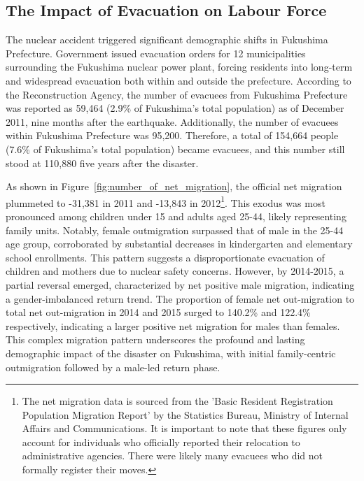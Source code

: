 \documentclass[a4paper,12pt]{article}
\begin{document}


\clearpage
\subsection{The Impact of Evacuation on Labour Force}
\label{sec4.1}

The nuclear accident triggered significant demographic shifts in Fukushima Prefecture. Government issued evacuation orders for 12 municipalities surrounding the Fukushima nuclear power plant, forcing residents into long-term and widespread evacuation both within and outside the prefecture. According to the Reconstruction Agency, the number of evacuees from Fukushima Prefecture was reported as 59,464 (2.9\% of Fukushima's total population) as of December 2011, nine months after the earthquake. Additionally, the number of evacuees within Fukushima Prefecture was 95,200. Therefore, a total of 154,664 people (7.6\% of Fukushima's total population) became evacuees, and this number still stood at 110,880 five years after the disaster.


As shown in Figure~\ref{fig:number_of_net_migration}, the official net migration plummeted to -31,381 in 2011 and -13,843 in 2012\footnote{The net migration data is sourced from the 'Basic Resident Registration Population Migration Report' by the Statistics Bureau, Ministry of Internal Affairs and Communications. It is important to note that these figures only account for individuals who officially reported their relocation to administrative agencies. There were likely many evacuees who did not formally register their moves.}. This exodus was most pronounced among children under 15 and adults aged 25-44, likely representing family units. Notably, female outmigration surpassed that of male in the 25-44 age group, corroborated by substantial decreases in kindergarten and elementary school enrollments. This pattern suggests a disproportionate evacuation of children and mothers due to nuclear safety concerns. However, by 2014-2015, a partial reversal emerged, characterized by net positive male migration, indicating a gender-imbalanced return trend. The proportion of female net out-migration to total net out-migration in 2014 and 2015 surged to 140.2\% and 122.4\% respectively, indicating a larger positive net migration for males than females. This complex migration pattern underscores the profound and lasting demographic impact of the disaster on Fukushima, with initial family-centric outmigration followed by a male-led return phase.
\end{document}
